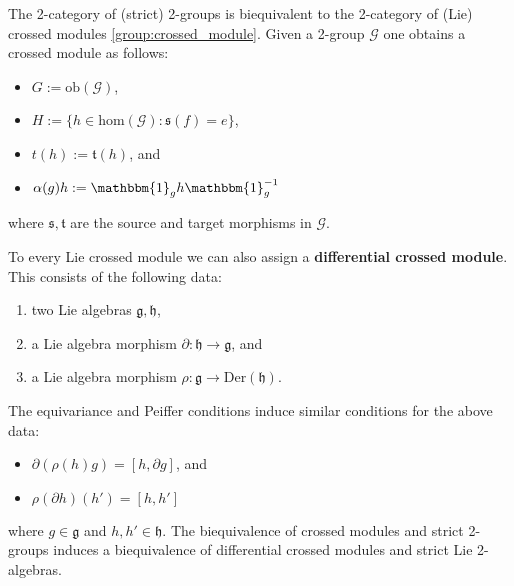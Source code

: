 
    \begin{property}
        The 2-category of (strict) 2-groups is biequivalent to the 2-category of (Lie) crossed modules \ref{group:crossed_module}. Given a 2-group $\mathcal{G}$ one obtains a crossed module as follows:
        \begin{itemize}
            \item $G:=\text{ob}(\mathcal{G})$,
            \item $H:=\{h\in\text{hom}(\mathcal{G}):\mathfrak{s}(f)=e\}$,
            \item $t(h):=\mathfrak{t}(h)$, and
            \item $\alpha(g)h := \mathbbm{1}_gh\mathbbm{1}_g^{-1}$
        \end{itemize}
        where $\mathfrak{s},\mathfrak{t}$ are the source and target morphisms in $\mathcal{G}$.

        To every Lie crossed module we can also assign a \textbf{differential crossed module}. This consists of the following data:
        \begin{enumerate}
            \item two Lie algebras $\mathfrak{g},\mathfrak{h}$,
            \item a Lie algebra morphism $\partial:\mathfrak{h}\rightarrow\mathfrak{g}$, and
            \item a Lie algebra morphism $\rho:\mathfrak{g}\rightarrow\text{Der}(\mathfrak{h})$.
        \end{enumerate}
        The equivariance and Peiffer conditions induce similar conditions for the above data:
        \begin{itemize}
            \item $\partial(\rho(h)g) = [h,\partial g]$, and
            \item $\rho(\partial h)(h') = [h,h']$
        \end{itemize}
        where $g\in\mathfrak{g}$ and $h,h'\in\mathfrak{h}$. The biequivalence of crossed modules and strict 2-groups induces a biequivalence of differential crossed modules and strict Lie 2-algebras.
    \end{property}

